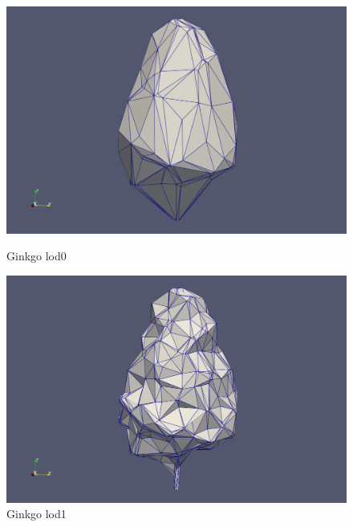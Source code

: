 \documentclass[12pt]{article}
\begin{document}
\begin{figure}[H]
    \centering
    \begin{minipage}{0.45\textwidth}
        \centering
        \includegraphics[width=1\textwidth]{images/gingko-lod0.png}
        \caption{Ginkgo lod0}
    \end{minipage}\hfill
    \begin{minipage}{0.45\textwidth}
        \centering
        \includegraphics[width=1\textwidth]{images/gingko-lod1.png}
        \caption{Ginkgo lod1}
    \end{minipage}
\end{figure}
\end{document}

